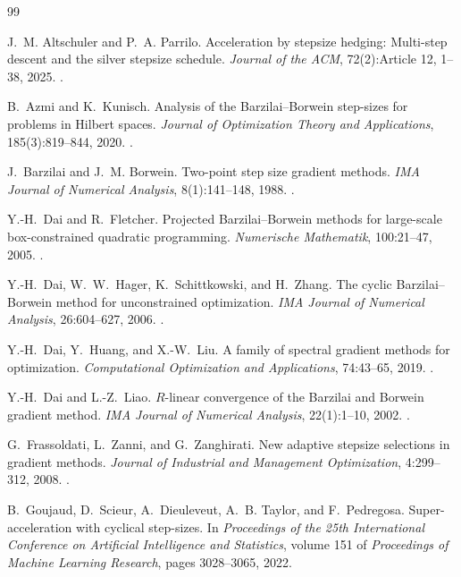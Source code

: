 \begin{thebibliography}{99}
\raggedright
{}
J.~M. Altschuler and P.~A. Parrilo.
Acceleration by stepsize hedging: Multi-step descent and the silver
stepsize schedule.
\emph{Journal of the ACM}, 72(2):Article 12, 1--38, 2025.
.


B.~Azmi and K.~Kunisch.
Analysis of the Barzilai--Borwein step-sizes for problems in Hilbert spaces.
\emph{Journal of Optimization Theory and Applications}, 185(3):819--844, 2020.
.

J.~Barzilai and J.~M. Borwein.
Two-point step size gradient methods.
\emph{IMA Journal of Numerical Analysis}, 8(1):141--148, 1988.
.


Y.-H.~Dai and R.~Fletcher.
Projected Barzilai--Borwein methods for large-scale box-constrained quadratic programming.
\emph{Numerische Mathematik}, 100:21--47, 2005.
.


Y.-H.~Dai, W.~W.~Hager, K.~Schittkowski, and H.~Zhang.
The cyclic Barzilai--Borwein method for unconstrained optimization.
\emph{IMA Journal of Numerical Analysis}, 26:604--627, 2006.
.


Y.-H.~Dai, Y.~Huang, and X.-W.~Liu.
A family of spectral gradient methods for optimization.
\emph{Computational Optimization and Applications}, 74:43--65, 2019.
.


Y.-H.~Dai and L.-Z.~Liao.
$R$-linear convergence of the Barzilai and Borwein gradient method.
\emph{IMA Journal of Numerical Analysis}, 22(1):1--10, 2002.
.


G.~Frassoldati, L.~Zanni, and G.~Zanghirati.
New adaptive stepsize selections in gradient methods.
\emph{Journal of Industrial and Management Optimization}, 4:299--312, 2008.
.


B.~Goujaud, D.~Scieur, A.~Dieuleveut, A.~B. Taylor, and F.~Pedregosa.
Super-acceleration with cyclical step-sizes.
In \emph{Proceedings of the 25th International Conference on Artificial
Intelligence and Statistics}, volume 151 of \emph{Proceedings of Machine
Learning Research}, pages 3028--3065, 2022.



\end{thebibliography}
